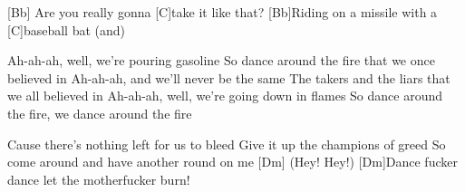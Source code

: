 \begin{guitar}
	
	[Bb] Are you really gonna [C]take it like that?
	[Bb]Riding on a missile with a [C]baseball bat (and)
	
	\begin{highlightbar}
		Ah-ah-ah, well, we're pouring gasoline
		So dance around the fire that we once believed in
		Ah-ah-ah, and we'll never be the same
		The takers and the liars that we all believed in
		Ah-ah-ah, well, we're going down in flames
		So dance around the fire, we dance around the fire
		
		Cause there's nothing left for us to bleed
		Give it up the champions of greed
		So come around and have another round on me
		[Dm] (Hey! Hey!)
		[Dm]Dance fucker dance let the motherfucker burn!
	\end{highlightbar}
\end{guitar}
